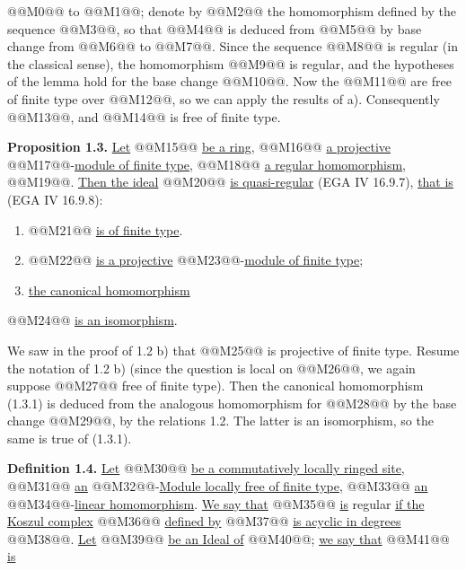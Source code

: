 @@M0@@ to @@M1@@; denote by @@M2@@ the homomorphism defined by the sequence @@M3@@, so that @@M4@@ is deduced from @@M5@@ by base change from @@M6@@ to @@M7@@. Since the sequence @@M8@@ is regular (in the classical sense), the homomorphism @@M9@@ is regular, and the hypotheses of the lemma hold for the base change @@M10@@. Now the @@M11@@ are free of finite type over @@M12@@, so we can apply the results of a). Consequently @@M13@@, and @@M14@@ is free of finite type.

\textbf{Proposition 1.3.} \uline{Let} @@M15@@ \uline{be a ring}, @@M16@@ \uline{a projective} @@M17@@-\uline{module of finite type}, @@M18@@ \uline{a regular homomorphism}, @@M19@@. \uline{Then the ideal} @@M20@@ \uline{is quasi-regular} (EGA IV 16.9.7), \uline{that is} (EGA IV 16.9.8):
\begin{enumerate}[label=\roman*)]
\item @@M21@@ \uline{is of finite type}.
\item @@M22@@ \uline{is a projective} @@M23@@-\uline{module of finite type};
\item \uline{the canonical homomorphism}
\end{enumerate}
@@M24@@
\uline{is an isomorphism}.

We saw in the proof of 1.2 b) that @@M25@@ is projective of finite type. Resume the notation of 1.2 b) (since the question is local on @@M26@@, we again suppose @@M27@@ free of finite type). Then the canonical homomorphism (1.3.1) is deduced from the analogous homomorphism for @@M28@@ by the base change @@M29@@, by the relations 1.2. The latter is an isomorphism, so the same is true of (1.3.1).

\textbf{Definition 1.4.} \uline{Let} @@M30@@ \uline{be a commutatively locally ringed site}, @@M31@@ \uline{an} @@M32@@-\uline{Module locally free of finite type}, @@M33@@ \uline{an} @@M34@@-\uline{linear homomorphism}. \uline{We say that} @@M35@@ \uline{is} regular \uline{if the Koszul complex} @@M36@@ \uline{defined by} @@M37@@ \uline{is acyclic in degrees} @@M38@@. \uline{Let} @@M39@@ \uline{be an Ideal of} @@M40@@; \uline{we say that} @@M41@@ \uline{is}

